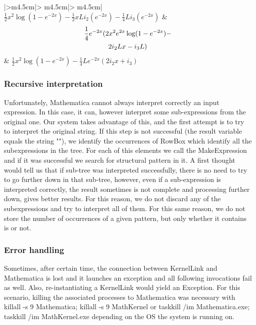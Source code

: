 \begin{longtable}{|>{\centering\arraybackslash}m{4.5cm}|>
{\centering\arraybackslash}m{4.5cm}|>
{\centering\arraybackslash}m{4.5cm}|}
\scriptsize{ $\frac{1}{2} x^2 \log \left(1-e^{-2 x}\right) - \frac{1}{2} x L i_ 2 \left(e^{-2 x}\right)-\frac{1}{4} L i_ 3 \left(e^{-2 x}\right)$ }          & \scriptsize { \begin{multline}  \frac{1}{4} e^{-2 x} (2 x^2 e^{2 x} \log (1-e^{-2 x})- \notag\\ 2 i_ 2 L x-i_ 3 L)  \end{multline} } & \scriptsize{ $\frac{1}{2} x^2 \log \left(1-e^{-2 x}\right)-\frac{1}{4} L e^{-2 x} \left(2 i_ 2 x+i_ 3\right)$ }      \\
\hline
\caption{Comparison of different simplification modes}

\label{comparison_simplification}

\end{longtable}
\subsubsection{Recursive interpretation}
Unfortunately, Mathematica cannot always interpret correctly an input expression. In this case, it can, however interpret some sub-expressions from the original one. Our system takes advantage of this, and the first attempt is to try to interpret the original string. If this step is not successful (the result variable equals the string "{}"), we identify the occurrences of {\codefont RowBox} which identify all the subexpressions in the tree. For each of this elements we call the {\codefont MakeExpression} and if it was successful we search for structural pattern in it. A first thought would tell us that if sub-tree was interpreted successfully, there is no need to try to go further down in that sub-tree, however, even if a sub-expression is interpreted correctly, the result sometimes is not complete and processing further down, gives better results. For this reason, we do not discard any of the subexpressions and try to interpret all of them. For this same reason, we do not store the number of occurrences of a given pattern, but only whether it contains is or not.

\subsubsection{Error handling}
Sometimes, after certain time, the connection between {\codefont KernelLink} and {\codefont Mathematica} is lost and it launches an exception and all following invocations fail as well.
Also, re-instantiating a KernelLink would yield an Exception. For this scenario, killing the associated processes to Mathematica was necessary with {\codefont killall -s 9 Mathematica; killall -s 9 MathKernel
} or {\codefont taskkill /im Mathematica.exe; taskkill /im MathKernel.exe} depending on the OS the system is running on.

